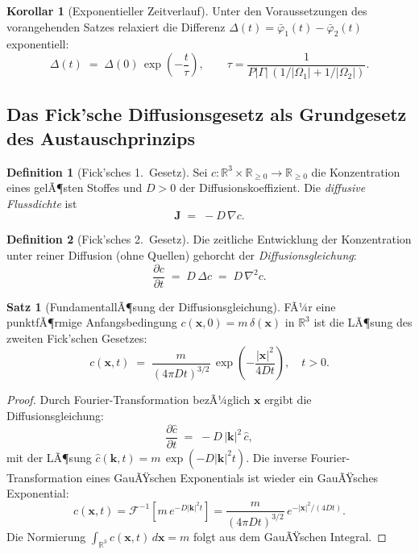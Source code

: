 ﻿\documentclass[a4paper,12pt]{article}
\theoremstyle{definition}
\newtheorem{definition}{Definition}
\newtheorem{satz}{Satz}
\newtheorem{korollar}{Korollar}
\begin{document}
\begin{korollar}[Exponentieller Zeitverlauf]
    Unter den Voraussetzungen des vorangehenden Satzes relaxiert die Differenz
    $\Delta(t) = \bar\varphi_1(t) - \bar\varphi_2(t)$ exponentiell:
    \[
        \Delta(t) \;=\; \Delta(0)\,\exp\!\left(-\frac{t}{\tau}\right),
        \qquad
        \tau = \frac{1}{P|\Gamma|\,(1/|\Omega_1| + 1/|\Omega_2|)}.
    \]
\end{korollar}

\subsection{Das Fick'sche Diffusionsgesetz als Grundgesetz des Austauschprinzips}

\begin{definition}[Fick'sches 1.\ Gesetz]
    Sei $c: \mathbb{R}^3 \times \mathbb{R}_{\geq 0} \to \mathbb{R}_{\geq 0}$ die
    Konzentration eines gelÃ¶sten Stoffes und $D > 0$ der Diffusionskoeffizient.
    Die \emph{diffusive Flussdichte} ist
    \[
        \mathbf{J} \;=\; -D\,\nabla c.
    \]
\end{definition}

\begin{definition}[Fick'sches 2.\ Gesetz]
    Die zeitliche Entwicklung der Konzentration unter reiner Diffusion (ohne Quellen)
    gehorcht der \emph{Diffusionsgleichung}:
    \[
        \frac{\partial c}{\partial t} \;=\; D\,\Delta c \;=\; D\,\nabla^2 c.
    \]
\end{definition}

\begin{satz}[FundamentallÃ¶sung der Diffusionsgleichung]
    FÃ¼r eine punktfÃ¶rmige Anfangsbedingung $c(\mathbf{x}, 0) = m\,\delta(\mathbf{x})$
    in $\mathbb{R}^3$ ist die LÃ¶sung des zweiten Fick'schen Gesetzes:
    \[
        c(\mathbf{x}, t) \;=\; \frac{m}{(4\pi D t)^{3/2}}\,
        \exp\!\left(-\frac{|\mathbf{x}|^2}{4Dt}\right), \quad t > 0.
    \]
\end{satz}

\begin{proof}
    Durch Fourier-Transformation bezÃ¼glich $\mathbf{x}$ ergibt die Diffusionsgleichung:
    \[
        \frac{\partial \hat{c}}{\partial t} \;=\; -D\,|\mathbf{k}|^2\,\hat{c},
    \]
    mit der LÃ¶sung $\hat{c}(\mathbf{k}, t) = m\,\exp(-D|\mathbf{k}|^2 t)$.
    Die inverse Fourier-Transformation eines GauÃŸschen Exponentials ist wieder ein
    GauÃŸsches Exponential:
    \[
        c(\mathbf{x}, t) = \mathcal{F}^{-1}\!\left[m\,e^{-D|\mathbf{k}|^2 t}\right]
        = \frac{m}{(4\pi Dt)^{3/2}}\,e^{-|\mathbf{x}|^2/(4Dt)}.
    \]
    Die Normierung $\int_{\mathbb{R}^3} c(\mathbf{x},t)\,d\mathbf{x} = m$ folgt aus
    dem GauÃŸschen Integral. \qedhere
\end{proof}
\end{document}
